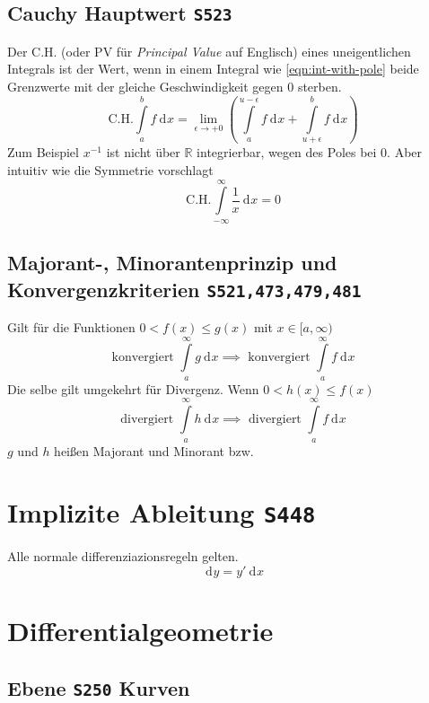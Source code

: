 \documentclass[a4paper, twocolumn]{article}
\numberwithin{equation}{subsection}
\newcommand{\dd}[2][]{\ensuremath{~\mathrm{d}^{#1} #2}}
\newcommand{\pderiv}[3][]{\ensuremath{\frac{\partial^{#1} #2}{\partial^{#1} #3}}}
\newcommand{\brpage}[1]{\textcolor{red!70!black}{\small\texttt{S#1}}}
\begin{document}
\subsection{Cauchy Hauptwert \brpage{523}}
Der C.H. (oder PV f\"ur \emph{Principal Value} auf Englisch) eines uneigentlichen Integrals ist der Wert, wenn in einem Integral wie \eqref{eqn:int-with-pole} beide Grenzwerte mit der gleiche Geschwindigkeit gegen 0 sterben.
\[
    \text{C.H.} \int\limits_a^b f \dd{x} = 
    \lim_{\epsilon\to +0} \left( \int\limits_a^{u-\epsilon} f \dd{x}
    + \int\limits_{u+\epsilon}^b f \dd{x} \right)
\]
Zum Beispiel \(x^{-1}\) ist nicht \"uber \(\mathbb{R}\) integrierbar, wegen des Poles bei 0. Aber intuitiv wie die Symmetrie vorschlagt
\[
    \text{C.H.} \int\limits^\infty_{-\infty} \frac{1}{x} \dd{x} = 0
\]

\subsection{Majorant-, Minorantenprinzip und Konvergenzkriterien \brpage{521,473,479,481}}

Gilt f\"ur die Funktionen \(0 < f(x) \leq g(x)\) mit \(x \in [a,\infty)\)
\[
    \text{konvergiert } \int\limits_a^\infty g \dd{x} 
    \implies \text{ konvergiert } \int\limits_a^\infty f \dd{x}
\]
Die selbe gilt umgekehrt f\"ur Divergenz. Wenn \(0 < h(x) \leq f(x)\) 
\[
    \text{divergiert } \int\limits_a^\infty h \dd{x} 
    \implies \text{ divergiert } \int\limits_a^\infty f \dd{x}
\]
\(g\) und \(h\) hei{\ss}en Majorant und Minorant bzw.

\section{Implizite Ableitung \brpage{448}}
Alle normale differenziazionsregeln gelten.
\[
    \dd{y} = y'\dd{x}
\]


\section{Differentialgeometrie}
\subsection{Ebene \brpage{250} Kurven}
\end{document}

